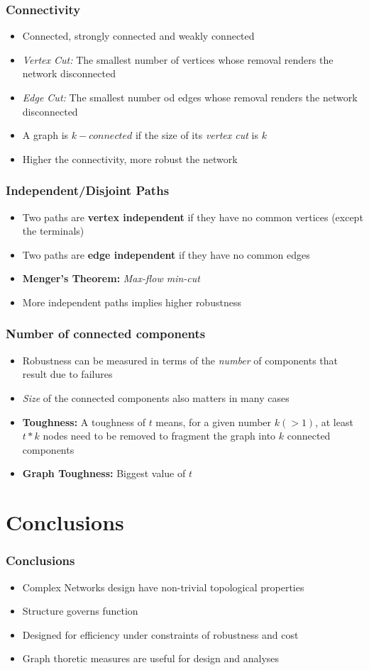 \documentclass{beamer}
\begin{document}
	\frame
	{
		\frametitle{Connectivity}
			\begin{itemize}
				\item<1-> {Connected, strongly connected and weakly connected}
				\item<2-> {\textit{Vertex Cut:} The smallest number of vertices whose removal renders the network disconnected}
				\item<3-> {\textit{Edge Cut:} The smallest number od edges whose removal renders the network disconnected}
				\item<4-> {A graph is $k-connected$ if the size of its \textit{vertex cut} is $k$}
				\item<5-> {Higher the connectivity, more robust the network}
			\end{itemize}

		
	}
	
	\frame
	{
		\frametitle{Independent/Disjoint Paths}
		\begin{itemize}
			\item<1-> {Two paths are \textbf{vertex independent} if they have no common vertices (except the terminals)}
			\item<2-> {Two paths are \textbf{edge independent} if they have no common edges}
			\item<3-> {\textbf{Menger's Theorem:} \textit{Max-flow min-cut}}
			\item<4-> {More independent paths implies higher robustness}
		\end{itemize}
	}
	
	\frame
	{
		\frametitle{Number of connected components}
			\begin{itemize}
				\item<1-> {Robustness can be measured in terms of the \textit{number} of components that result due to failures}
				\item<2-> {\textit{Size} of the connected components also matters in many cases}
				\item<3-> {\textbf{Toughness: } A toughness of $t$ means, for a given number $k (> 1)$, at least $t*k$ nodes need to be removed to fragment the graph into $k$ connected components}
				\item<4-> {\textbf{Graph Toughness:} Biggest value of $t$}
			\end{itemize}
	}

	

\section{Conclusions}
	\frame
	{
	\frametitle{Conclusions}	
	\begin{itemize}
		\item<1-> {Complex Networks design have non-trivial topological properties}
		\item<2-> {Structure governs function}
		\item<3-> {Designed for efficiency under constraints of robustness and cost}
		\item<4-> {Graph thoretic measures are useful for design and analyses}
	\end{itemize}	
	}

		
\end{document}
